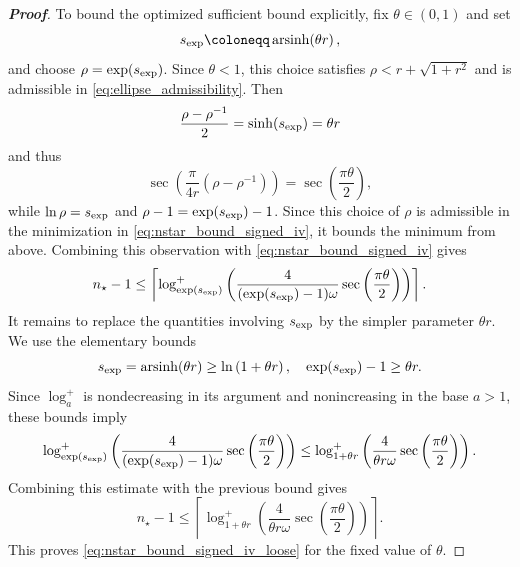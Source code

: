 \begin{proof}[\bf Proof]
To bound the optimized sufficient bound explicitly, fix $\theta\in(0,1)$ and set
\begin{equation*}
s_{\rm exp}\coloneqq \operatorname{arsinh}\!\left(\theta r\right),
\end{equation*}
and choose $\rho=\exp(s_{\rm exp})$. Since $\theta<1$, this choice satisfies $\rho<r+\sqrt{1+r^2}$ and is admissible in \cref{eq:ellipse_admissibility}. Then
\begin{equation*}
\frac{\rho-\rho^{-1}}{2}
=
\sinh(s_{\rm exp})
=\theta r
\end{equation*}
and thus
\begin{equation*}
\sec\left(\frac{\pi}{4r}(\rho-\rho^{-1})\right)
=\sec\left(\frac{\pi\theta}{2}\right),
\end{equation*}
while $\ln\rho=s_{\rm exp}$ and $\rho-1=\exp(s_{\rm exp})-1$. Since this choice of $\rho$ is admissible in the minimization in \cref{eq:nstar_bound_signed_iv}, it bounds the minimum from above. Combining this observation with \cref{eq:nstar_bound_signed_iv} gives
\begin{equation*}
n_\star-1
\le
\left\lceil
\log^+_{\exp(s_{\rm exp})}\left(\dfrac{4}{(\exp(s_{\rm exp})-1)\omega}
\sec\left(\frac{\pi\theta}{2}\right)\right)
\right\rceil.
\end{equation*}
It remains to replace the quantities involving $s_{\rm exp}$ by the simpler parameter $\theta r$. We use the elementary bounds
\begin{equation*}
s_{\rm exp}=\operatorname{arsinh}\!\left(\theta r\right)\ge \ln\left(1+\theta r\right),
\quad
\exp(s_{\rm exp})-1\ge \theta r.
\end{equation*}
Since $\log_a^+$ is nondecreasing in its argument and nonincreasing in the base $a>1$, these bounds imply
\begin{equation*}
\log^+_{\exp(s_{\rm exp})}\left(\dfrac{4}{(\exp(s_{\rm exp})-1)\omega}
\sec\left(\frac{\pi\theta}{2}\right)\right)
\leq
\log^+_{1+\theta r}\left(\dfrac{4}{\theta r\omega}
\sec\left(\frac{\pi\theta}{2}\right)\right).
\end{equation*}
Combining this estimate with the previous bound gives
\begin{equation*}
n_\star-1
\leq
\left\lceil
\log^+_{1+\theta r}\left(\frac{4}{\theta r\omega}
\sec\left(\frac{\pi\theta}{2}\right)\right)
\right\rceil.
\end{equation*}
This proves \cref{eq:nstar_bound_signed_iv_loose} for the fixed value of $\theta$.
\end{proof}

